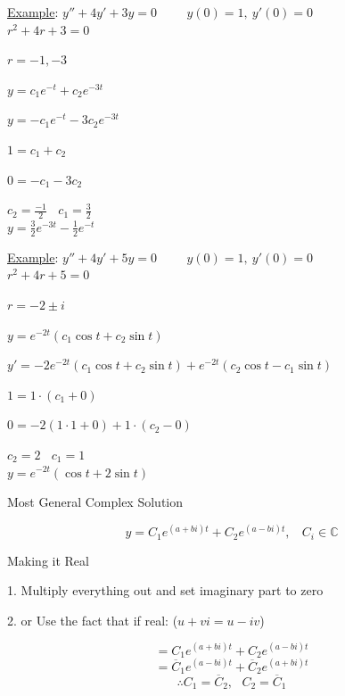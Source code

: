 \documentclass[12pt]{article}
\numberwithin{equation}{subsection}
\newcommand{\inda}{\hspace{.5cm}}
\newcommand{\indb}{\hspace{1cm}}
\newcommand{\indd}{\hspace{2cm}}
\newcommand{\indh}{\hspace{4cm}}
\newcommand{\exa}{\noindent \underline{Example}: \hspace{1cm}}
\begin{document}
\exa $y''+4y'+3y=0 \hspace{1cm} y(0)=1, \ y'(0)=0$\\

\indd $r^2+4r+3=0$

\indd $r=-1, -3$

\indb $y=c_1e^{-t} + c_2e^{-3t}$

\indb $y=-c_1e^{-t} -3c_2e^{-3t}$

\indh $1=c_1 + c_2$

\indh $0=-c_1 -3c_2$

\indd $c_2=\frac{-1}{2}\ \ \ \ c_1=\frac{3}{2}$\\

\inda $y=\frac{3}{2}e^{-3t} - \frac{1}{2}e^{-t}$

\bigskip


\exa $y''+4y'+5y=0 \hspace{1cm} y(0)=1, \ y'(0)=0$\\

\indd $r^2+4r+5=0$

\indd $r=-2\pm i$

\indb $y=e^{-2t}(c_1\cos t + c_2\sin t)$

\indb $y'=-2e^{-2t}(c_1\cos t + c_2\sin t) + e^{-2t}(c_2\cos t - c_1\sin t)$

\indh $1=1 \cdot (c_1 + 0)$

\indh $0=-2(1 \cdot 1 + 0)+ 1 \cdot (c_2 - 0)$

\indd $c_2=2\ \ \ \ c_1=1$\\

\inda $y=e^{-2t}(\cos t + 2\sin t)$


\newpage

\noindent Most General Complex Solution

\begin{equation}
y=C_1e^{(a+bi)t}+C_2e^{(a-bi)t}, \ \ \ \ C_i \in \mathbb{C}
\end{equation}

Making it Real

\indb 1. Multiply everything out and set imaginary part to zero

\indb 2. or Use the fact that if real: ($u+vi=u-iv $)

\begin{equation}
=C_1e^{(a+bi)t}+C_2e^{(a-bi)t} \tag{2.1.19}
\end{equation}
\begin{equation}
=\overline{C}_1e^{(a-bi)t}+\overline{C}_2e^{(a+bi)t}
\end{equation}
\begin{equation}
\therefore C_1=\overline{C}_2,\ \ \ C_2=\overline{C}_1
\end{equation}
\end{document}
